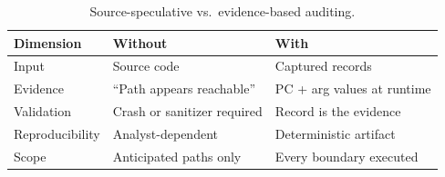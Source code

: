 \documentclass{article}
\begin{document}
\begin{table}[t]
\centering
\caption{Source-speculative vs.\ evidence-based auditing.}\label{tab:methodology}
\small
\begin{tabular}{@{}lll@{}}
\toprule
\textbf{Dimension} & \textbf{Without \toolname{}} & \textbf{With \toolname{}} \\
\midrule
Input & Source code & Captured records \\
Evidence & ``Path appears reachable'' & PC + arg values at runtime \\
Validation & Crash or sanitizer required & Record is the evidence \\
Reproducibility & Analyst-dependent & Deterministic artifact \\
Scope & Anticipated paths only & Every boundary executed \\
\bottomrule
\end{tabular}
\end{table}
\end{document}
